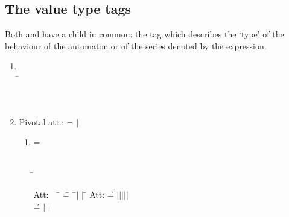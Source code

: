 \subsection{The value type tags}

Both  and  have a child in common:
the  tag which describes the `type' of the
behaviour of the automaton or of the series denoted by the
expression.

\begin{enumerate}
\addtocounter{enumi}{\value{enumitemp}}

\item  {}
\begin{tabbing}
      \\[\taglnskp]
\tagindent{}\tagsp\= \kill
\tagindent{} \>  \opt\\[\taglnskp]
\tagindent{}\>  \req\\[\taglnskp]
\tagindent{}  \>  \req\\[\taglnskp]
\end{tabbing}

\item  {}

\begin{tabbing}
\ptn
Pivotal att.:  = $|$\tagsp
                      \token   \req
\end{tabbing}


\begin{enumerate}

\item  {} = 

\begin{tabbing}
\\[\taglnskp]
\tagindent{}\tagsp\= \kill
\tagindent{} \>  \opt\\[\taglnskp]
\end{tabbing}

\begin{tabbing}
\ptn Att: \ \ \= \= = \ \= $|$
                        $|$
                          \tagsp \=\token \req
                         \kill
\ptn
Att:\>\>  \' =
   \> $|$$|$$|$$|$$|$
   \> \token  \req \\
   \>\> \' = \>$|$
                                $|$
                                 \tagsp \>\token\req
\end{tabbing}


\end{enumerate}
\end{enumerate}
